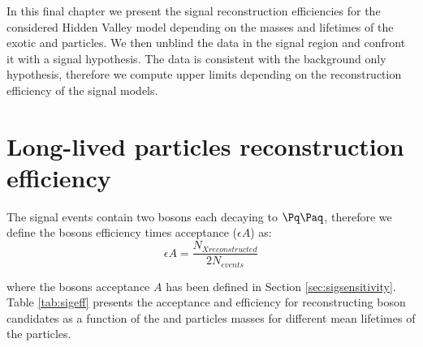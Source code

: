 In this final chapter we present the signal reconstruction efficiencies for the considered
 Hidden Valley
model depending on the masses and lifetimes of the exotic \Higgs and \X particles. 
We then unblind the data in the signal region and confront it with a
 signal hypothesis. The data is consistent with the background only hypothesis, therefore we
compute upper limits depending on the reconstruction efficiency of the signal models.

\section{Long-lived particles reconstruction efficiency}
\label{sec:signalefficiency}

The signal events contain two \X bosons each decaying to $\qq$, therefore we define the \X bosons 
 efficiency times acceptance ($\epsilon A$) as:
\begin{equation}
\epsilon A= \frac{N_{X reconstructed}}{2N_{events}}
\end{equation}

where the \X bosons acceptance $A$ has been defined in Section \ref{sec:sigsensitivity}. 
Table \ref{tab:sigeff} presents the acceptance and efficiency for
reconstructing \X boson candidates as a function of the \Higgs and \X particles masses for different 
mean lifetimes of the \X particles.

